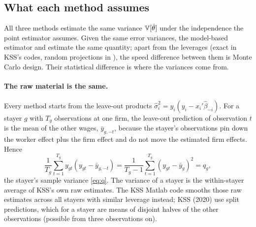 \subsection{What each method assumes}\label{kss:sec:assumptions}

All three methods estimate the same variance $\mathbb{V}[\hat\theta]$ under the independence the point estimator
assumes. Given the same error variances, the model-based estimator and \fevc{} estimate the same quantity;
apart from the leverages (exact in KSS's codes, random projections in \fevc), the speed difference between them
is Monte Carlo design. Their statistical difference is where the
variances come from.

\paragraph{The raw material is the same.} Every method starts from the leave-out products
$\hat\sigma_i^2=y_i(y_i-x_i'\hat\beta_{-i})$. For a stayer $g$ with $T_g$ observations at one firm, the
leave-out prediction of observation $t$ is the mean of the other wages, $\bar y_{g,-t}$, because the
stayer's observations pin down the worker effect plus the firm effect and do not move the estimated firm
effects. Hence
\[
\frac1{T_g}\sum_{t=1}^{T_g} y_{gt}(y_{gt}-\bar y_{g,-t})=\frac{1}{T_g-1}\sum_{t=1}^{T_g}(y_{gt}-\bar y_g)^2=q_g ,
\]
the stayer's sample variance \eqref{eq:q}. The \fevc{} variance of a stayer is the within-stayer average of KSS's own
raw estimates. The KSS Matlab code smooths those raw estimates across all stayers with similar leverage
instead; KSS (2020) use split predictions, which for a stayer are means of disjoint halves of the other
observations (possible from three observations on).

